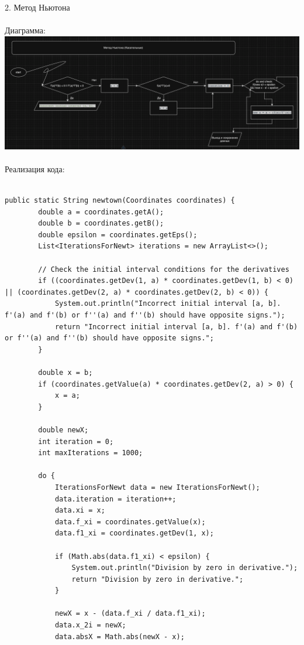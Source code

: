 \documentclass{article}
\begin{document}
2. Метод Ньютона
\\ \\
Диаграмма:\\
\includegraphics[width=.7\textwidth]{newtown.png}
\\ \\
Реализация кода:
\\ \\
\begin{lstlisting}[frame=single, basicstyle=\ttfamily, breaklines=true, breakatwhitespace=true, postbreak=\mbox{\textcolor{red}{$\hookrightarrow$}\space}]
    public static String newtown(Coordinates coordinates) {
        double a = coordinates.getA();
        double b = coordinates.getB();
        double epsilon = coordinates.getEps();
        List<IterationsForNewt> iterations = new ArrayList<>();

        // Check the initial interval conditions for the derivatives
        if ((coordinates.getDev(1, a) * coordinates.getDev(1, b) < 0) || (coordinates.getDev(2, a) * coordinates.getDev(2, b) < 0)) {
            System.out.println("Incorrect initial interval [a, b]. f'(a) and f'(b) or f''(a) and f''(b) should have opposite signs.");
            return "Incorrect initial interval [a, b]. f'(a) and f'(b) or f''(a) and f''(b) should have opposite signs.";
        }

        double x = b;
        if (coordinates.getValue(a) * coordinates.getDev(2, a) > 0) {
            x = a;
        }

        double newX;
        int iteration = 0;
        int maxIterations = 1000;

        do {
            IterationsForNewt data = new IterationsForNewt();
            data.iteration = iteration++;
            data.xi = x;
            data.f_xi = coordinates.getValue(x);
            data.f1_xi = coordinates.getDev(1, x);

            if (Math.abs(data.f1_xi) < epsilon) {
                System.out.println("Division by zero in derivative.");
                return "Division by zero in derivative.";
            }

            newX = x - (data.f_xi / data.f1_xi);
            data.x_2i = newX;
            data.absX = Math.abs(newX - x);


\end{lstlisting}
\end{document}
